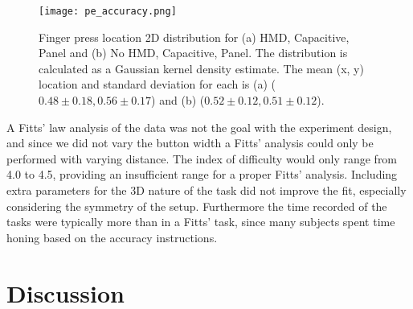 \begin{figure}
    \centering
    \texttt{[image: pe\_accuracy.png]}
    \caption{Finger press location 2D distribution for (a) HMD, Capacitive, Panel and (b) No HMD, Capacitive, Panel. The distribution is calculated as a Gaussian kernel density estimate. The mean (x, y) location and standard deviation for each is (a) ($0.48\pm0.18, 0.56\pm0.17$) and (b) ($0.52\pm0.12, 0.51\pm0.12$).}
    \label{fig:pe_accuracy}
\end{figure}

A Fitts’ law analysis of the data was not the goal with the experiment design, and since we did not vary the button width a Fitts’ analysis could only be performed with varying distance.
The index of difficulty would only range from 4.0 to 4.5, providing an insufficient range for a proper Fitts’ analysis.
Including extra parameters for the 3D nature of the task \cite{murata_extending_2001, cha_extended_2013} did not improve the fit, especially considering the symmetry of the setup.
Furthermore the time recorded of the tasks were typically more than in a Fitts' task, since many subjects spent time honing based on the accuracy instructions.



\section{Discussion}

